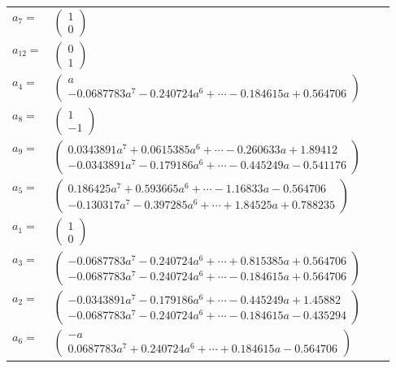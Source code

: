 \documentclass[1p]{elsarticle_modified}
\theoremstyle{definition}
\begin{document}
\begin{tabular}{m{7pt} m{180pt} m{7pt} m{180pt} }
\flushright $a_{7}=$&$\begin{pmatrix}1\\0\end{pmatrix}$ \\
\flushright $a_{12}=$&$\begin{pmatrix}0\\1\end{pmatrix}$ \\
\flushright $a_{4}=$&$\begin{pmatrix}a\\-0.0687783 a^{7}-0.240724 a^{6}+\cdots-0.184615 a+0.564706\end{pmatrix}$ \\
\flushright $a_{8}=$&$\begin{pmatrix}1\\-1\end{pmatrix}$ \\
\flushright $a_{9}=$&$\begin{pmatrix}0.0343891 a^{7}+0.0615385 a^{6}+\cdots-0.260633 a+1.89412\\-0.0343891 a^{7}-0.179186 a^{6}+\cdots-0.445249 a-0.541176\end{pmatrix}$ \\
\flushright $a_{5}=$&$\begin{pmatrix}0.186425 a^{7}+0.593665 a^{6}+\cdots-1.16833 a-0.564706\\-0.130317 a^{7}-0.397285 a^{6}+\cdots+1.84525 a+0.788235\end{pmatrix}$ \\
\flushright $a_{1}=$&$\begin{pmatrix}1\\0\end{pmatrix}$ \\
\flushright $a_{3}=$&$\begin{pmatrix}-0.0687783 a^{7}-0.240724 a^{6}+\cdots+0.815385 a+0.564706\\-0.0687783 a^{7}-0.240724 a^{6}+\cdots-0.184615 a+0.564706\end{pmatrix}$ \\
\flushright $a_{2}=$&$\begin{pmatrix}-0.0343891 a^{7}-0.179186 a^{6}+\cdots-0.445249 a+1.45882\\-0.0687783 a^{7}-0.240724 a^{6}+\cdots-0.184615 a-0.435294\end{pmatrix}$ \\
\flushright $a_{6}=$&$\begin{pmatrix}- a\\0.0687783 a^{7}+0.240724 a^{6}+\cdots+0.184615 a-0.564706\end{pmatrix}$ \\

\end{tabular}
\end{document}
